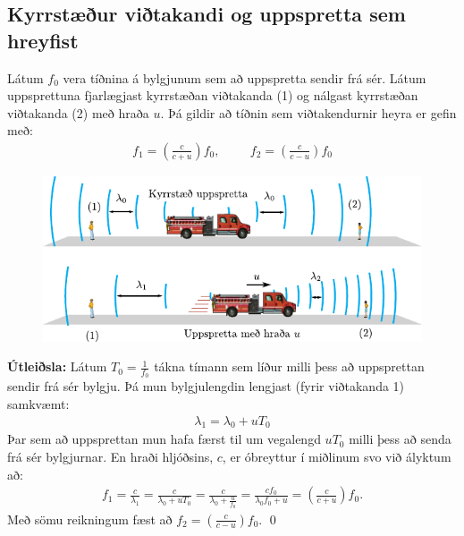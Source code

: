 \ifdefined \wholebook \else\documentclass[oneside]{book}\usepackage{EdlBook}\graphicspath{{figures/}}
\begin{document}
\subsection*{Kyrrstæður viðtakandi og uppspretta sem hreyfist}

\begin{tcolorbox}
\begin{theorem}
Látum $f_0$ vera tíðnina á bylgjunum sem að uppspretta sendir frá sér. Látum uppsprettuna fjarlægjast kyrrstæðan viðtakanda (1) og nálgast kyrrstæðan viðtakanda (2) með hraða $u$. Þá gildir að tíðnin sem viðtakendurnir heyra er gefin með:
\begin{align*}
    f_1 = \left( \frac{c}{c + u} \right)f_0, \hspace{1cm} f_2 = \left( \frac{c}{c - u} \right)f_0
\end{align*}
\begin{figure}[H]
    \centering
    \vspace{-0.5cm}
    \includegraphics[scale = 0.8]{figures/doppler-brunabill.pdf}
\end{figure}
\end{theorem}
\end{tcolorbox}

\textbf{Útleiðsla:} Látum $T_0 = \frac{1}{f_0}$ tákna tímann sem líður milli þess að uppsprettan sendir frá sér bylgju. Þá mun bylgjulengdin lengjast (fyrir viðtakanda 1) samkvæmt:
\begin{align*}
    \lambda_1 = \lambda_0 + uT_0
\end{align*}
Þar sem að uppsprettan mun hafa færst til um vegalengd $uT_0$ milli þess að senda frá sér bylgjurnar. En hraði hljóðsins, $c$, er óbreyttur í miðlinum svo við ályktum að:
\begin{align*}
    f_1 = \frac{c}{\lambda_1} = \frac{c}{\lambda_0 + u T_0} = \frac{c}{\lambda_0 + \frac{u}{f_0}} = \frac{cf_0}{\lambda_0 f_0 + u} = \left(\frac{c}{c+u} \right)f_0.
\end{align*}
Með sömu reikningum fæst að $f_2 = \left(\frac{c}{c-u}\right) f_0$. \qed
\end{document}
